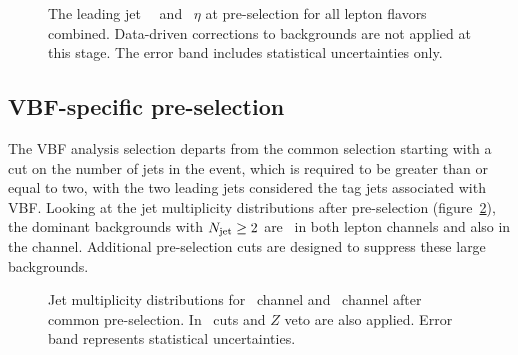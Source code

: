 \begin{figure}[h]
\centering
{}
\caption{The leading jet~
  \pt~and~ $\eta$ at
  pre-selection for all lepton flavors combined. Data-driven
  corrections to backgrounds are not applied at this stage. The
error band includes statistical uncertainties only.}
\label{chap:analysis:fig:jet_lead}
\end{figure}


\subsection{VBF-specific pre-selection}
\label{subsec:vbf_select}

The VBF analysis selection departs from the common selection starting
with a cut on the number of jets in the event, which is required to be
greater than or equal to two, with the two leading jets considered the
tag jets associated with VBF. Looking at the jet multiplicity
distributions after pre-selection (figure~\ref{chap:analysis:fig:jet_mult}), the
dominant backgrounds with $N_{\textrm{jet}} \geq 2$ are \ttbar~in
both lepton channels and also \ZDY in the \eemm channel. Additional
pre-selection cuts are designed to suppress these large backgrounds. 

\begin{figure}[h]
    \centering
    \caption{Jet multiplicity distributions
      for~ \emme channel
      and~ \eemm channel after
      common pre-selection. In~
    \etmiss cuts and $Z$ veto are also applied. Error band represents
    statistical uncertainties.}
\label{chap:analysis:fig:jet_mult}
\end{figure}

